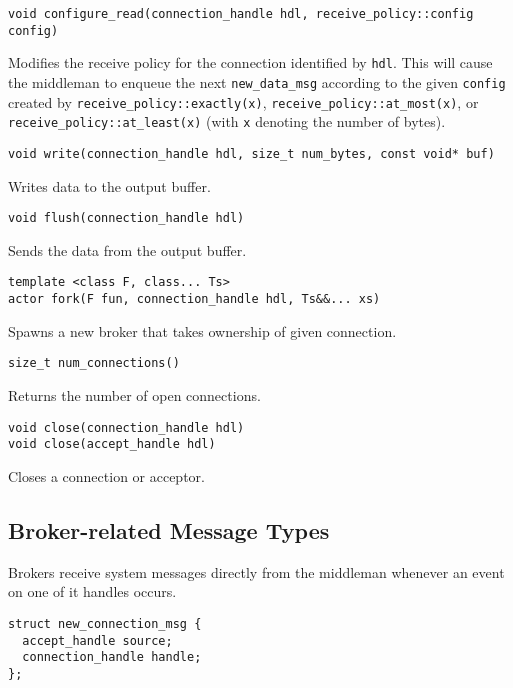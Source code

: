 \begin{lstlisting}
void configure_read(connection_handle hdl, receive_policy::config config)
\end{lstlisting}

Modifies the receive policy for the connection identified by \lstinline^hdl^. This will cause the middleman to enqueue the next \lstinline^new_data_msg^ according to the given \lstinline^config^ created by \lstinline^receive_policy::exactly(x)^, \lstinline^receive_policy::at_most(x)^, or \lstinline^receive_policy::at_least(x)^ (with \lstinline^x^ denoting the number of bytes).

\begin{lstlisting}
void write(connection_handle hdl, size_t num_bytes, const void* buf)
\end{lstlisting}

Writes data to the output buffer.

\begin{lstlisting}
void flush(connection_handle hdl)
\end{lstlisting}

Sends the data from the output buffer.

\begin{lstlisting}
template <class F, class... Ts>
actor fork(F fun, connection_handle hdl, Ts&&... xs)
\end{lstlisting}

Spawns a new broker that takes ownership of given connection.

\begin{lstlisting}
size_t num_connections()
\end{lstlisting}

Returns the number of open connections.

\begin{lstlisting}
void close(connection_handle hdl)
void close(accept_handle hdl)
\end{lstlisting}

Closes a connection or acceptor.

\clearpage
\subsection{Broker-related Message Types}

Brokers receive system messages directly from the middleman whenever an event on one of it handles occurs.

\begin{lstlisting}
struct new_connection_msg {
  accept_handle source;
  connection_handle handle;
};
\end{lstlisting}

